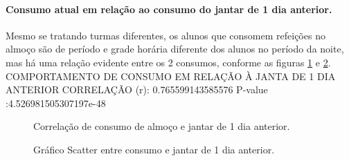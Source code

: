 \documentclass[	12pt, Times, openright, twoside, a4paper, english, brazil]{abntex2}
\begin{document}
                \paragraph{Consumo atual em relação ao consumo do jantar de 1 dia anterior.}
                    Mesmo se tratando turmas diferentes,  os alunos que consomem refeições no almoço são de período e grade horária diferente dos alunos no período da noite, mas há uma relação evidente entre os 2 consumos, conforme as figuras \ref{fig:case1_consumo_jantar} e \ref{fig:case1_consumo_jantar_scatter}.\newline
                    COMPORTAMENTO DE CONSUMO EM RELAÇÃO À JANTA DE 1 DIA ANTERIOR\newline
                    CORRELAÇÃO (r): 0.765599143585576\newline
                    P-value :4.526981505307197e-48\newline
                    \begin{figure}[!ht]
                	\caption{Correlação de consumo de almoço e jantar de 1 dia anterior. \label{fig:case1_consumo_jantar} }
                    \end{figure}
                    \begin{figure}[!ht]
                    	\caption{Gráfico Scatter entre consumo e jantar de 1 dia anterior. \label{fig:case1_consumo_jantar_scatter} }
                    \end{figure}
\end{document}
